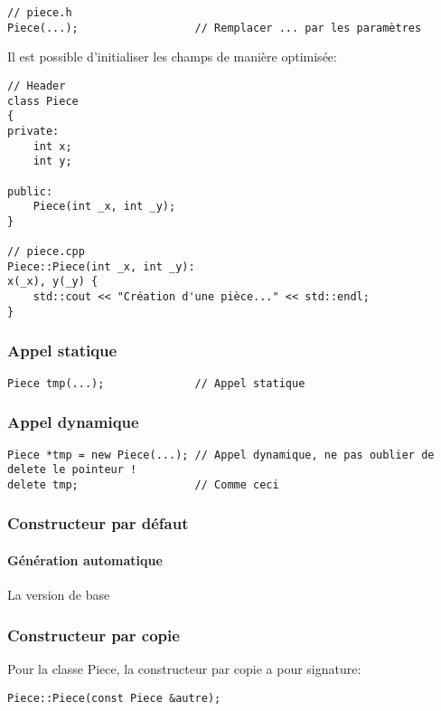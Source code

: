 \documentclass[10pt,a4paper,french]{article}
\begin{document}
\begin{verbatim}
// piece.h
Piece(...);                  // Remplacer ... par les paramètres
\end{verbatim}

Il est possible d'initialiser les champs de manière optimisée:
\begin{verbatim}
// Header
class Piece
{
private:
    int x;
    int y;

public:
    Piece(int _x, int _y);
}

// piece.cpp
Piece::Piece(int _x, int _y):
x(_x), y(_y) {
    std::cout << "Création d'une pièce..." << std::endl;
}
\end{verbatim}

\subsubsection{Appel statique}

\begin{verbatim}
Piece tmp(...);              // Appel statique
\end{verbatim}

\subsubsection{Appel dynamique}

\begin{verbatim}
Piece *tmp = new Piece(...); // Appel dynamique, ne pas oublier de delete le pointeur !
delete tmp;                  // Comme ceci
\end{verbatim}

\subsubsection{Constructeur par défaut}

\paragraph{Génération automatique}
La version de base 

\subsubsection{Constructeur par copie\label{constructeur-copie}}

Pour la classe Piece, la constructeur par copie a pour signature:

\begin{verbatim}
Piece::Piece(const Piece &autre);
\end{verbatim}
\end{document}
